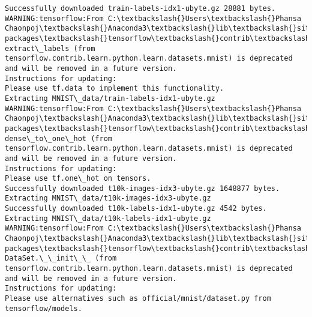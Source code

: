 \documentclass[11pt]{article}
\begin{document}
\begin{Verbatim}[commandchars=\\\{\}]
Successfully downloaded train-labels-idx1-ubyte.gz 28881 bytes.
WARNING:tensorflow:From C:\textbackslash{}Users\textbackslash{}Phansa Chaonpoj\textbackslash{}Anaconda3\textbackslash{}lib\textbackslash{}site-packages\textbackslash{}tensorflow\textbackslash{}contrib\textbackslash{}learn\textbackslash{}python\textbackslash{}learn\textbackslash{}datasets\textbackslash{}mnist.py:267: extract\_labels (from tensorflow.contrib.learn.python.learn.datasets.mnist) is deprecated and will be removed in a future version.
Instructions for updating:
Please use tf.data to implement this functionality.
Extracting MNIST\_data/train-labels-idx1-ubyte.gz
WARNING:tensorflow:From C:\textbackslash{}Users\textbackslash{}Phansa Chaonpoj\textbackslash{}Anaconda3\textbackslash{}lib\textbackslash{}site-packages\textbackslash{}tensorflow\textbackslash{}contrib\textbackslash{}learn\textbackslash{}python\textbackslash{}learn\textbackslash{}datasets\textbackslash{}mnist.py:110: dense\_to\_one\_hot (from tensorflow.contrib.learn.python.learn.datasets.mnist) is deprecated and will be removed in a future version.
Instructions for updating:
Please use tf.one\_hot on tensors.
Successfully downloaded t10k-images-idx3-ubyte.gz 1648877 bytes.
Extracting MNIST\_data/t10k-images-idx3-ubyte.gz
Successfully downloaded t10k-labels-idx1-ubyte.gz 4542 bytes.
Extracting MNIST\_data/t10k-labels-idx1-ubyte.gz
WARNING:tensorflow:From C:\textbackslash{}Users\textbackslash{}Phansa Chaonpoj\textbackslash{}Anaconda3\textbackslash{}lib\textbackslash{}site-packages\textbackslash{}tensorflow\textbackslash{}contrib\textbackslash{}learn\textbackslash{}python\textbackslash{}learn\textbackslash{}datasets\textbackslash{}mnist.py:290: DataSet.\_\_init\_\_ (from tensorflow.contrib.learn.python.learn.datasets.mnist) is deprecated and will be removed in a future version.
Instructions for updating:
Please use alternatives such as official/mnist/dataset.py from tensorflow/models.

    \end{Verbatim}
\end{document}
